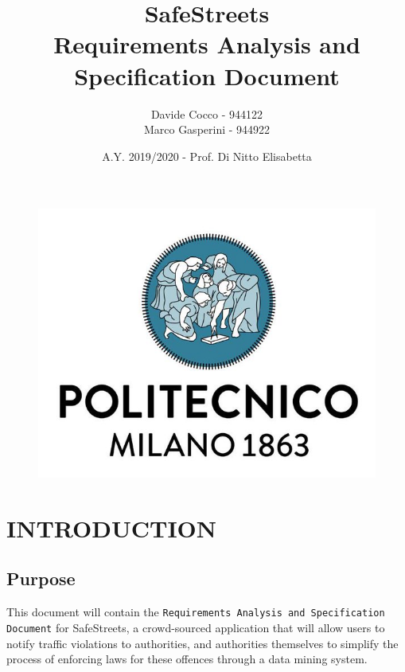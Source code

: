 \documentclass[12pt,a4paper]{article}
\author{Davide Cocco - 944122\\
	Marco Gasperini - 944922}
\date{A.Y. 2019/2020 - Prof. Di Nitto Elisabetta}
\title{
	\textbf{\Huge{SafeStreets}} \\
	\large Requirements Analysis and Specification Document
}
\begin{document}
	\begin{figure}
		\centering
		\includegraphics[width=1.0\linewidth]{Images/polimi.jpg}
	\end{figure}

	\maketitle
	\newpage
	\tableofcontents
	\newpage

\section{INTRODUCTION}
\subsection{Purpose} 
This document will contain the \texttt{Requirements Analysis and Specification Document} for SafeStreets, a crowd-sourced application that will allow users to notify traffic violations to authorities, and authorities themselves to simplify the process of enforcing laws for these offences through a data mining system.
 
\end{document}

